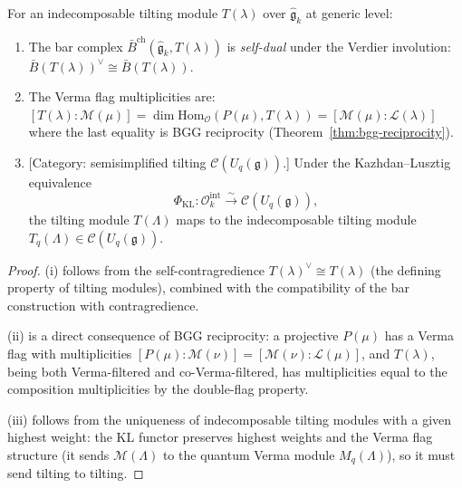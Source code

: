 \begin{proposition}
\label{prop:tilting-bar}
For an indecomposable tilting module $T(\lambda)$ over
$\widehat{\mathfrak{g}}_k$ at generic level:
\begin{enumerate}[label=\textup{(\roman*)}]
\item The bar complex $\bar{B}^{\mathrm{ch}}(\widehat{\mathfrak{g}}_k,
 T(\lambda))$ is \emph{self-dual} under the Verdier involution:
 $\bar{B}(T(\lambda))^\vee \cong \bar{B}(T(\lambda))$.
\item The Verma flag multiplicities are:
 $[T(\lambda) : \mathcal{M}(\mu)]
 = \dim \mathrm{Hom}_{\mathcal{O}}(P(\mu), T(\lambda))
 = [\mathcal{M}(\mu) : \mathcal{L}(\lambda)]$
 where the last equality is BGG reciprocity
 \textup{(}Theorem~\textup{\ref{thm:bgg-reciprocity})}.
\item \textup{[Category: semisimplified tilting
 $\mathcal{C}(U_q(\mathfrak{g}))$.]}
 Under the Kazhdan--Lusztig equivalence
 \[
 \Phi_{\mathrm{KL}}\colon
 \mathcal{O}_k^{\mathrm{int}} \xrightarrow{\sim}
 \mathcal{C}(U_q(\mathfrak{g})),
 \]
 the tilting module $T(\Lambda)$ maps to the indecomposable
 tilting module
 $T_q(\Lambda) \in \mathcal{C}(U_q(\mathfrak{g}))$.
\end{enumerate}
\end{proposition}

\begin{proof}
(i) follows from the self-contragredience
$T(\lambda)^\vee \cong T(\lambda)$ (the defining property of tilting
modules), combined with the compatibility of the bar construction
with contragredience.

(ii) is a direct consequence of BGG reciprocity: a projective
$P(\mu)$ has a Verma flag with multiplicities
$[P(\mu) : \mathcal{M}(\nu)] = [\mathcal{M}(\nu) : \mathcal{L}(\mu)]$,
and $T(\lambda)$, being both Verma-filtered and co-Verma-filtered, has
multiplicities equal to the composition multiplicities by the
double-flag property.

(iii) follows from the uniqueness of indecomposable tilting modules
with a given highest weight: the KL functor preserves highest
weights and the Verma flag structure (it sends
$\mathcal{M}(\Lambda)$ to the quantum Verma module
$M_q(\Lambda)$), so it must send tilting to tilting.

\end{proof}

